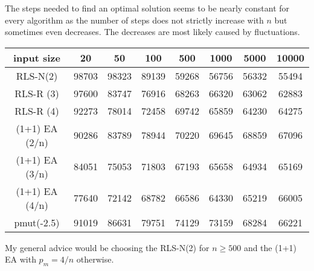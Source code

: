 The steps needed to find an optimal solution seems to be nearly constant for every algorithm as the number of steps does not strictly increase with $n$ but sometimes even decreases.
The decreases are most likely caused by fluctuations.

\begin{tabular}[h]{cccccccc}
      input size    & 20    & 50    & 100   & 500   & 1000  & 5000  & 10000 \\\hline
      RLS-N(2)      & 98703 & 98323 & 89139 & 59268 & 56756 & 56332 & 55494 \\
      RLS-R (3)      & 97600 & 83747 & 76916 & 68263 & 66320 & 63062 & 62883 \\
      RLS-R (4)      & 92273 & 78014 & 72458 & 69742 & 65859 & 64230 & 64275 \\
      (1+1) EA (2/n) & 90286 & 83789 & 78944 & 70220 & 69645 & 68859 & 67096 \\
      (1+1) EA (3/n) & 84051 & 75053 & 71803 & 67193 & 65658 & 64934 & 65169 \\
      (1+1) EA (4/n) & 77640 & 72142 & 68782 & 66586 & 64330 & 65219 & 66005 \\
      pmut(-2.5)    & 91019 & 86631 & 79751 & 74129 & 73159 & 68284 & 66221 \\
\end{tabular}

My general advice would be choosing the RLS-N(2) for $n\ge500$ and the (1+1) EA with $p_m=4/n$ otherwise.
